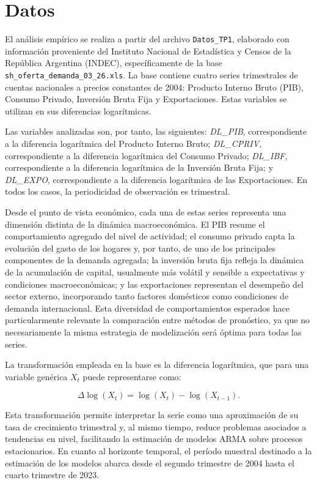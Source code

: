 \documentclass[12pt,a4paper]{article}
\begin{document}
	\section{Datos}
	
	El análisis empírico se realiza a partir del archivo \texttt{Datos\_TP1}, elaborado con información proveniente del Instituto Nacional de Estadística y Censos de la República Argentina (INDEC), específicamente de la base \texttt{sh\_oferta\_demanda\_03\_26.xls}. La base contiene cuatro series trimestrales de cuentas nacionales a precios constantes de 2004: Producto Interno Bruto (PIB), Consumo Privado, Inversión Bruta Fija y Exportaciones. Estas variables se utilizan en sus diferencias logarítmicas.
	
	Las variables analizadas son, por tanto, las siguientes: \textit{DL\_PIB}, correspondiente a la diferencia logarítmica del Producto Interno Bruto; \textit{DL\_CPRIV}, correspondiente a la diferencia logarítmica del Consumo Privado; \textit{DL\_IBF}, correspondiente a la diferencia logarítmica de la Inversión Bruta Fija; y \textit{DL\_EXPO}, correspondiente a la diferencia logarítmica de las Exportaciones. En todos los casos, la periodicidad de observación es trimestral.
	
	Desde el punto de vista económico, cada una de estas series representa una dimensión distinta de la dinámica macroeconómica. El PIB resume el comportamiento agregado del nivel de actividad; el consumo privado capta la evolución del gasto de los hogares y, por tanto, de uno de los principales componentes de la demanda agregada; la inversión bruta fija refleja la dinámica de la acumulación de capital, usualmente más volátil y sensible a expectativas y condiciones macroeconómicas; y las exportaciones representan el desempeño del sector externo, incorporando tanto factores domésticos como condiciones de demanda internacional. Esta diversidad de comportamientos esperados hace particularmente relevante la comparación entre métodos de pronóstico, ya que no necesariamente la misma estrategia de modelización será óptima para todas las series.
	
	La transformación empleada en la base es la diferencia logarítmica, que para una variable genérica $X_t$ puede representarse como:
	
	\begin{equation}
		\Delta \log(X_t)=\log(X_t)-\log(X_{t-1}).
	\end{equation}
	
	Esta transformación permite interpretar la serie como una aproximación de su tasa de crecimiento trimestral y, al mismo tiempo, reduce problemas asociados a tendencias en nivel, facilitando la estimación de modelos ARMA sobre procesos estacionarios. En cuanto al horizonte temporal, el período muestral destinado a la estimación de los modelos abarca desde el segundo trimestre de 2004 hasta el cuarto trimestre de 2023. 
	
\end{document}
